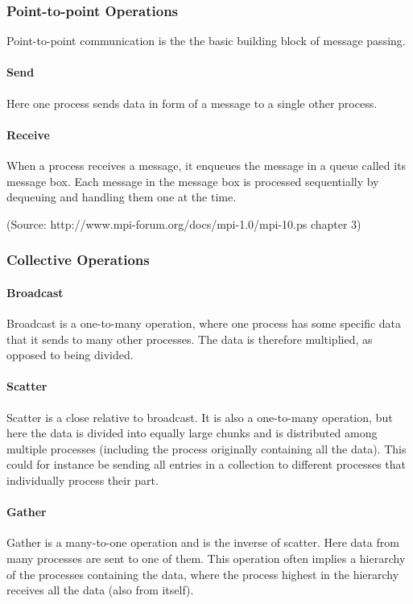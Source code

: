 \subsubsection{Point-to-point Operations}
Point-to-point communication is the the basic building block of message passing.
\paragraph{Send}
Here one process sends data in form of a message to a single other process.
\paragraph{Receive}
When a process receives a message, it enqueues the message in a queue called its message box. Each message in the message box is processed sequentially by dequeuing and handling them one at the time.

(Source: http://www.mpi-forum.org/docs/mpi-1.0/mpi-10.ps chapter 3)

\subsubsection{Collective Operations}
\paragraph{Broadcast}
Broadcast is a one-to-many operation, where one process has some specific data that it sends to many other processes. The data is therefore multiplied, as opposed to being divided.

\paragraph{Scatter}
Scatter is a close relative to broadcast. It is also a one-to-many operation, but here the data is divided into equally large chunks and is distributed among multiple processes (including the process originally containing all the data). This could for instance be sending all entries in a collection to different processes that individually process their part.

\paragraph{Gather}
Gather is a many-to-one operation and is the inverse of scatter. Here data from many processes are sent to one of them. This operation often implies a hierarchy of the processes containing the data, where the process highest in the hierarchy receives all the data (also from itself).

